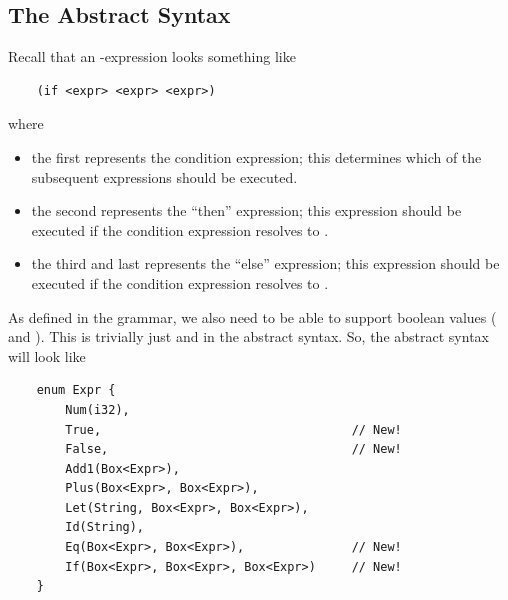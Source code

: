 \documentclass[letterpaper]{article}
\begin{document}
\subsection{The Abstract Syntax}
Recall that an -expression looks something like 
\begin{verbatim}
    (if <expr> <expr> <expr>)\end{verbatim}
where 
\begin{itemize}
    \item the first  represents the condition expression; this determines which of the subsequent expressions should be executed. 
    \item the second  represents the ``then'' expression; this expression should be executed if the condition expression resolves to .
    \item the third and last  represents the ``else'' expression; this expression should be executed if the condition expression resolves to .
\end{itemize}
As defined in the grammar, we also need to be able to support boolean values ( and ). This is trivially just  and  in the abstract syntax. So, the abstract syntax will look like 
\begin{verbatim}
    enum Expr {
        Num(i32),
        True,                                   // New!
        False,                                  // New!
        Add1(Box<Expr>),
        Plus(Box<Expr>, Box<Expr>),
        Let(String, Box<Expr>, Box<Expr>),
        Id(String),
        Eq(Box<Expr>, Box<Expr>),               // New!
        If(Box<Expr>, Box<Expr>, Box<Expr>)     // New!
    }\end{verbatim}
\end{document}
